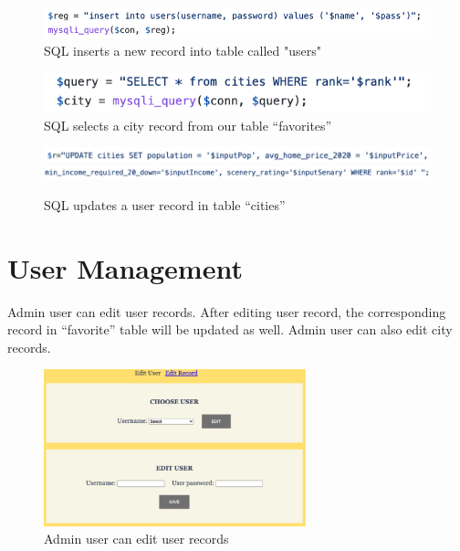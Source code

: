 \documentclass[12pt, letterpaper]{article}
\begin{document}
\begin{figure}[htbp]
	\centering
	\includegraphics[width=6in]{images/q16-1.png}
	\caption{SQL inserts a new record into table called "users" }
 \end{figure}
 
 \begin{figure}[htbp]
	\centering
	\includegraphics[width=6in]{images/q16-2.png}
	\caption{SQL selects a city record from our table “favorites” }
 \end{figure}
 
 \begin{figure}[htbp]
	\centering
	\includegraphics[width=6in]{images/q16-3.png}
	\includegraphics[width=6in]{images/q16-4.png}
	\caption{SQL updates a user record in table “cities” }
 \end{figure}

 \newpage

\section{User Management}
Admin user can edit user records. After editing user record, the corresponding record in “favorite” table will be updated as well.  Admin user can also edit city records.

\begin{figure}[htbp]
	\centering
	\includegraphics[width=3in]{images/q17-1.png}
	\caption{Admin user can edit user records}
 \end{figure}
 
\end{document}
